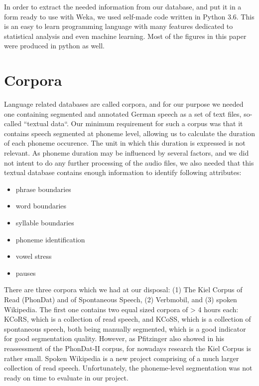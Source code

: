 \documentclass[a4paper]{scrreprt}
\begin{document}
In order to extract the needed information from our database, and put it in a form ready to use with Weka, we used self-made code written in Python 3.6. This is an easy to learn programming language with many features dedicated to statistical analysis and even machine learning. Most of the figures in this paper were produced in python as well.

\chapter{Corpora}
Language related databases are called corpora, and for our purpose we needed one containing segmented and annotated German speech as a set of text files, so-called ``textual data``. Our minimum requirement for such a corpus was that it contains speech segmented at phoneme level, allowing us to calculate the duration of each phoneme occurence. The unit in which this duration is expressed is not relevant. As phoneme duration may be influenced by several factors, and we did not intent to do any further processing of the audio files, we also needed that this textual database contains enough information to identify following attributes: 

\begin{itemize}
	\item phrase boundaries
	\item word boundaries
	\item syllable boundaries
	\item phoneme identification
	\item vowel stress
	\item pauses
\end{itemize}

There are three corpora which we had at our disposal: (1) The Kiel Corpus of Read (PhonDat) and of Spontaneous Speech, (2) Verbmobil, and (3) spoken Wikipedia. The first one contains two equal sized corpora of > 4 hours each: KCoRS, which is a collection of read speech, and KCoSS, which is a collection of spontaneous speech, both being manually segmented, which is a good indicator for good segmentation quality. However, as Pfitzinger \cite{Pfitzinger2002} also showed in his reassessment of the PhonDat-II corpus, for nowadays research the Kiel Corpus is rather small. Spoken Wikipedia is a new project comprising of a much larger collection of read speech. Unfortunately, the phoneme-level segmentation was not ready on time to evaluate in our project.
\end{document}
